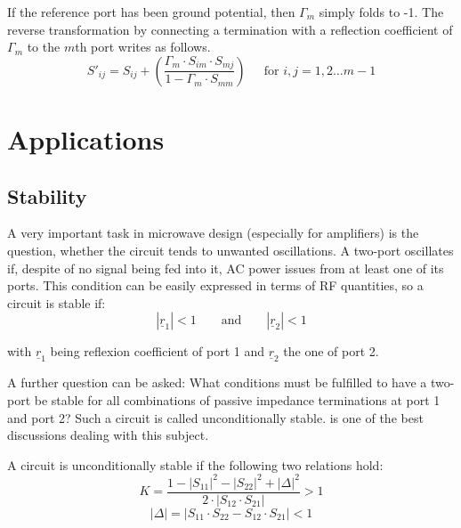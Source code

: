 If the reference port has been ground potential, then $\Gamma_m$
simply folds to -1.  The reverse transformation by connecting a
termination with a reflection coefficient of $\Gamma_m$ to the $m$th
port writes as follows.
\begin{equation}
S'_{ij} = S_{ij} + \left(\dfrac{\Gamma_m\cdot S_{im}\cdot S_{mj}}{1 - \Gamma_m\cdot S_{mm}}\right)
\;\;\;\; \textrm{ for } i,j = 1,2 \ldots m - 1
\end{equation}

\section{Applications}

\subsection{Stability}

A very important task in microwave design (especially for amplifiers)
is the question, whether the circuit tends to unwanted oscillations.
A two-port oscillates if, despite of no signal being fed into it, AC
power issues from at least one of its ports.  This condition can be
easily expressed in terms of RF quantities, so a circuit is stable
if:
\begin{equation}
|\underline{r}_1| < 1  \qquad \text{and} \qquad  |\underline{r}_2| < 1
\end{equation}

with $\underline{r}_1$ being reflexion coefficient of port 1 and
$\underline{r}_2$ the one of port 2.

\addvspace{12pt}

A further question can be asked: What conditions must be fulfilled to have a
two-port be stable for all combinations of passive impedance terminations at
port 1 and port 2?  Such a circuit is called unconditionally stable.
\cite{Edwards3} is one of the best discussions dealing with this subject.

\addvspace{12pt}

A circuit is unconditionally stable if the following two relations
hold:
\begin{equation}
K = \frac{1-|S_{11}|^2-|S_{22}|^2+|\Delta|^2}{2\cdot |S_{12}\cdot S_{21}|} > 1
\end{equation}
\begin{equation}
|\Delta| = |S_{11}\cdot S_{22} - S_{12}\cdot S_{21}| < 1
\end{equation}

